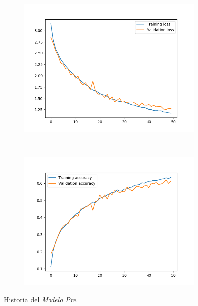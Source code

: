 \documentclass[11pt,a4paper]{article}
\begin{document}
\begin{figure}[H]
  \centering
  \begin{subfigure}{.5\textwidth}
    \includegraphics[scale=0.4]{img/batch-pre-loss.png}
    \label{fig:batch-pre-loss}
  \end{subfigure}%
  ~ \quad
  \begin{subfigure}{.5\textwidth}
    \includegraphics[scale=0.4]{img/batch-pre-acc.png}
    \label{fig:batch-pre-acc}
  \end{subfigure}
  \caption{Historia del \textit{Modelo Pre}.}
  \label{fig:history-batch-pre}
\end{figure}
\end{document}
